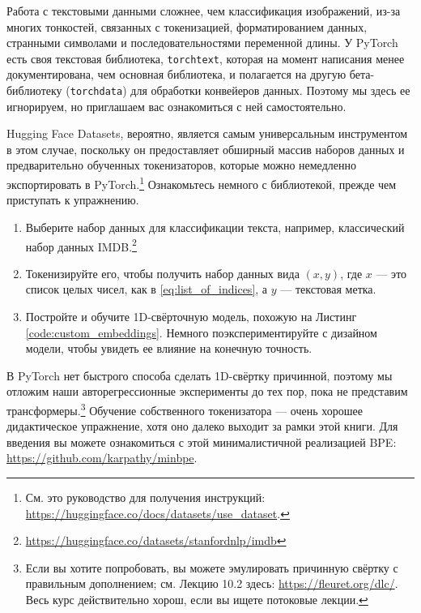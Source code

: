 Работа с текстовыми данными сложнее, чем классификация изображений, из-за многих тонкостей, связанных с токенизацией, форматированием данных, странными символами и последовательностями переменной длины. У PyTorch есть своя текстовая библиотека, \texttt{torchtext}, которая на момент написания менее документирована, чем основная библиотека, и полагается на другую бета-библиотеку (\texttt{torchdata}) для обработки конвейеров данных. Поэтому мы здесь ее игнорируем, но приглашаем вас ознакомиться с ней самостоятельно.

Hugging Face Datasets, вероятно, является самым универсальным инструментом в этом случае, поскольку он предоставляет обширный массив наборов данных и предварительно обученных токенизаторов, которые можно немедленно экспортировать в PyTorch.\footnote{См. это руководство для получения инструкций: \url{https://huggingface.co/docs/datasets/use_dataset}.} Ознакомьтесь немного с библиотекой, прежде чем приступать к упражнению.

\begin{enumerate}
\item Выберите набор данных для классификации текста, например, классический набор данных IMDB.\footnote{\url{https://huggingface.co/datasets/stanfordnlp/imdb}} 
\item Токенизируйте его, чтобы получить набор данных вида $(x,y)$, где $x$ — это список целых чисел, как в \eqref{eq:list_of_indices}, а $y$ — текстовая метка.
\item Постройте и обучите 1D-свёрточную модель, похожую на Листинг \ref{code:custom_embeddings}. Немного поэкспериментируйте с дизайном модели, чтобы увидеть ее влияние на конечную точность.
\end{enumerate}

В PyTorch нет быстрого способа сделать 1D-свёртку причинной, поэтому мы отложим наши авторегрессионные эксперименты до тех пор, пока не представим трансформеры.\footnote{Если вы хотите попробовать, вы можете эмулировать причинную свёртку с правильным дополнением; см. Лекцию 10.2 здесь: \url{https://fleuret.org/dlc/}. Весь курс действительно хорош, если вы ищете потоковые лекции.} Обучение собственного токенизатора — очень хорошее дидактическое упражнение, хотя оно далеко выходит за рамки этой книги. Для введения вы можете ознакомиться с этой минималистичной реализацией BPE: \url{https://github.com/karpathy/minbpe}.